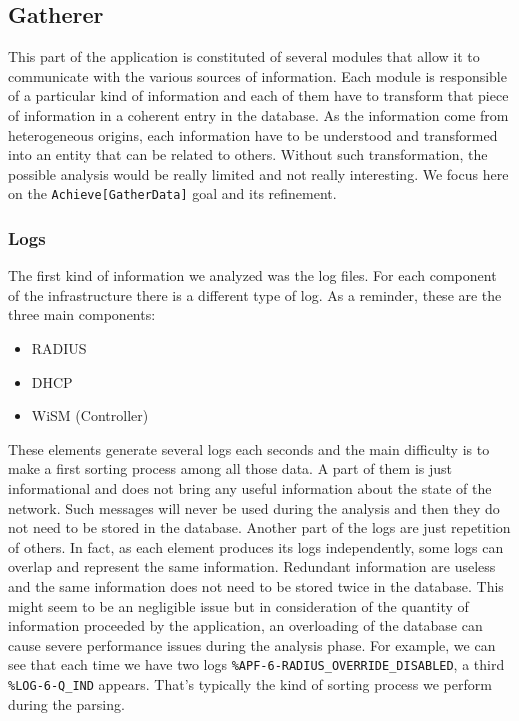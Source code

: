 \subsection{Gatherer}
This part of the application is constituted of several modules that allow it to communicate with the various sources of information. Each module is responsible of a particular kind of information and each of them have to transform that piece of information in a coherent entry in the database. As the information come from heterogeneous origins, each information have to be understood and transformed into an entity that can be related to others. Without such transformation, the possible analysis would be really limited and not really interesting. We focus here on the \texttt{Achieve[GatherData]} goal and its refinement.

\subsubsection{Logs}
The first kind of information we analyzed was the log files. For each component of the infrastructure there is a different type of log. As a reminder, these are the three main components:
\begin{itemize}
\item RADIUS
\item DHCP
\item WiSM (Controller)
\end{itemize}
These elements generate several logs each seconds and the main difficulty is to make a first sorting process among all those data. A part of them is just informational and does not bring any useful information about the state of the network. Such messages will never be used during the analysis and then they do not need to be stored in the database. Another part of the logs are just repetition of others. In fact, as each element produces its logs independently, some logs can overlap and represent the same information. Redundant information are useless and the same information does not need to be stored twice in the database. This might seem to be an negligible issue but in consideration of the quantity of information proceeded by the application, an overloading of the database can cause severe performance issues during the analysis phase. For example, we can see that each time we have two logs \texttt{\%APF-6-RADIUS\_OVERRIDE\_DISABLED}, a third \texttt{\%LOG-6-Q\_IND} appears. That's typically the kind of sorting process we perform during the parsing.\\

